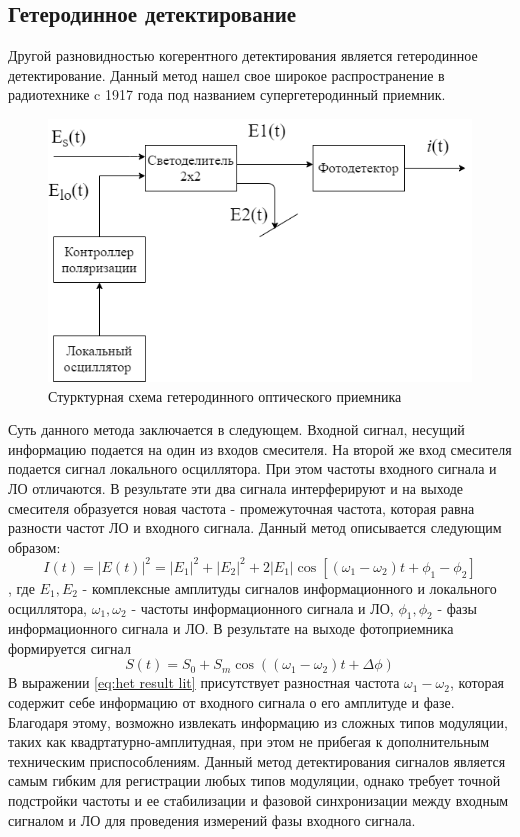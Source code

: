 \subsection{Гетеродинное детектирование}\label{sec:ch1/sect3/heterodyne lit}
Другой разновидностью когерентного  детектирования является гетеродинное детектирование. Данный метод нашел свое широкое распространение в радиотехнике c 1917 года под названием супергетеродинный приемник.
\begin{figure}
    \centering
    \includegraphics[width=\linewidth]{images/гетеродин для обзора.png}
    \caption{Стурктурная схема гетеродинного оптического приемника}
    \label{fig:heterodyne scheme lit}
\end{figure}
Суть данного метода заключается в следующем. Входной сигнал, несущий информацию подается на один из входов смесителя. На второй же вход смесителя подается сигнал локального осциллятора. При этом частоты входного сигнала и ЛО отличаются. В результате эти два сигнала интерферируют и на выходе смесителя образуется новая частота - промежуточная частота, которая равна разности частот ЛО и входного сигнала. Данный метод описывается следующим образом:
\begin{equation}
    I(t) =|E(t)|^2 =  |E_1|^2 + |E_2|^2 + 2|E_1|\cos[(\omega_1 - \omega_2)t + \phi_1 - \phi_2]
\end{equation}\label{eq: fiedl heterodyne}, где $E_1, E_2$ - комплексные амплитуды сигналов информационного и локального осциллятора, $\omega_1, \omega_2$ - частоты информационного сигнала и ЛО, $\phi_1, \phi_2$ - фазы информационного сигнала и ЛО. 
В результате на выходе фотоприемника формируется сигнал 
\begin{equation}
    S(t) = S_0 + S_m\cos((\omega_1 - \omega_2)t + \Delta\phi)
\end{equation}\label{eq:het result lit}
В выражении \ref{eq:het result lit} присутствует разностная частота $\omega_1 - \omega_2$, которая содержит себе информацию от входного сигнала о его амплитуде и фазе. Благодаря этому, возможно извлекать информацию из сложных типов модуляции, таких как квадртатурно-амплитудная, при этом не прибегая к дополнительным техническим приспособлениям. Данный метод детектирования сигналов является самым гибким для регистрации любых типов модуляции, однако требует точной подстройки частоты и ее стабилизации и фазовой синхронизации между входным сигналом и ЛО для проведения измерений фазы входного сигнала. 

